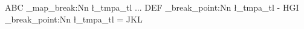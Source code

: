 \documentclass{article}
\begin{document}
\ExplSyntaxOn
ABC
\prg_map_break:Nn \l_tmpa_tl { ... } %
DEF
\prg_break_point:Nn \l_tmpa_tl { - } %
HGI
\prg_break_point:Nn \l_tmpa_tl { = } %
JKL
\ExplSyntaxOff
\end{document}

